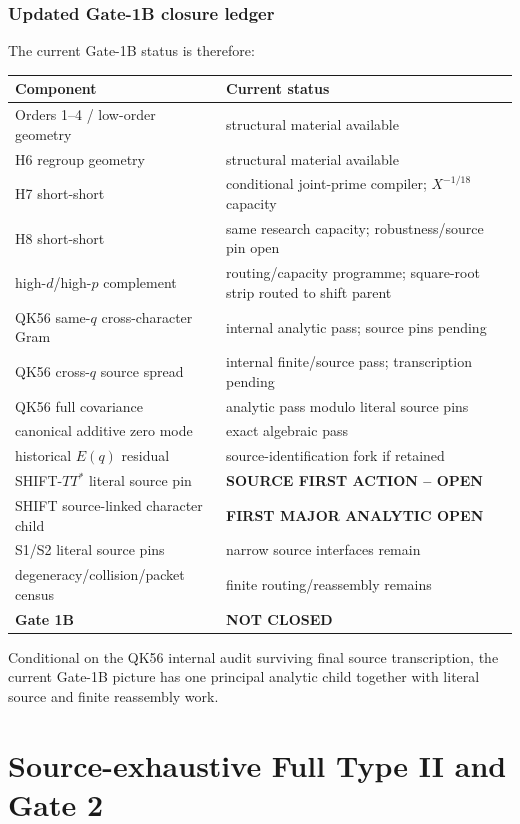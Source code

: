 \documentclass[11pt]{article}
\theoremstyle{definition}
\theoremstyle{remark}
\newcommand{\1}{\mathbf 1}
\begin{document}
\section{Updated Gate-1B closure ledger}
\label{sec:g1b-late-ledger}

The current Gate-1B status is therefore:
\begin{center}
\begin{tabular}{p{}p{}}
\toprule
Component & Current status\\
\midrule
Orders 1--4 / low-order geometry & structural material available\\
H6 regroup geometry & structural material available\\
H7 short-short & conditional joint-prime compiler; $X^{-1/18}$ capacity\\
H8 short-short & same research capacity; robustness/source pin open\\
high-$d$/high-$p$ complement & routing/capacity programme; square-root strip routed to shift parent\\
QK56 same-$q$ cross-character Gram & internal analytic pass; source pins pending\\
QK56 cross-$q$ source spread & internal finite/source pass; transcription pending\\
QK56 full covariance & analytic pass modulo literal source pins\\
canonical additive zero mode & exact algebraic pass\\
historical $E(q)$ residual & source-identification fork if retained\\
SHIFT-$TT^*$ literal source pin & \textbf{SOURCE FIRST ACTION -- OPEN}\\
SHIFT source-linked character child & \textbf{FIRST MAJOR ANALYTIC OPEN}\\
S1/S2 literal source pins & narrow source interfaces remain\\
degeneracy/collision/packet census & finite routing/reassembly remains\\
\textbf{Gate 1B} & \textbf{NOT CLOSED}\\
\bottomrule
\end{tabular}
\end{center}
Conditional on the QK56 internal audit surviving final source transcription, the current Gate-1B picture has one
principal analytic child together with literal source and finite reassembly work.

\part{Source-exhaustive Full Type II and Gate 2}
\end{document}
